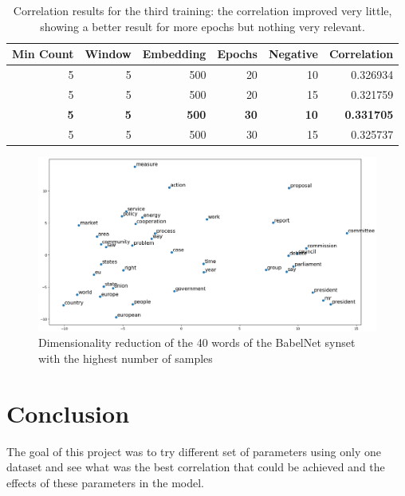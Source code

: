 \documentclass[11pt,oneside,a4paper]{article}
\begin{document}
\begin{table}[]
\centering
\begin{tabular}{@{}rrrrrr@{}}
\toprule
\multicolumn{1}{l}{Min Count} & \multicolumn{1}{l}{Window} & \multicolumn{1}{l}{Embedding} & \multicolumn{1}{l}{Epochs} & \multicolumn{1}{l}{Negative} & \multicolumn{1}{l}{Correlation} \\ \midrule
5 & 5 & 500 & 20 & 10 & 0.326934 \\
5 & 5 & 500 & 20 & 15 & 0.321759 \\
\textbf{5} & \textbf{5} & \textbf{500} & \textbf{30} & \textbf{10} & \textbf{0.331705} \\
5 & 5 & 500 & 30 & 15 & 0.325737 \\ \bottomrule
\end{tabular}
\caption{Correlation results for the third training: the correlation improved very little, showing a better result for more epochs but nothing very relevant.}
\label{tab:third-training}
\end{table}

\begin{figure}
  \includegraphics[scale=0.385]{nlp.png}
  \centering
  \caption{Dimensionality reduction of the 40 words of the BabelNet synset with the highest number of samples}
  \label{fig:pca}
\end{figure}


\section{Conclusion}

The goal of this project was to try different set of parameters using only one dataset and see what was the best correlation that could be achieved and the effects of these parameters in the model.
\end{document}
